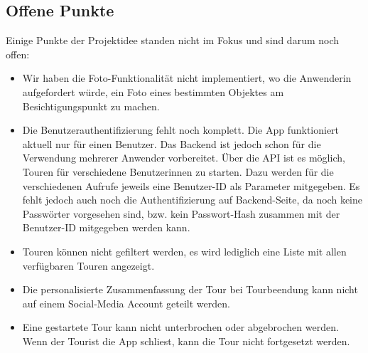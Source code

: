 \subsection{Offene Punkte}
\label{offenePunkte}
Einige Punkte der Projektidee standen nicht im Fokus und sind darum noch offen:
\begin{itemize}
\item Wir haben die Foto-Funktionalität nicht implementiert, wo die Anwenderin aufgefordert würde, ein Foto eines bestimmten Objektes am Besichtigungspunkt zu machen.
\item Die Benutzerauthentifizierung fehlt noch komplett. Die App funktioniert aktuell nur für einen Benutzer. Das Backend ist jedoch schon für die Verwendung mehrerer Anwender vorbereitet. Über die API ist es möglich, Touren für verschiedene Benutzerinnen zu starten. Dazu werden für die verschiedenen Aufrufe jeweils eine Benutzer-ID als Parameter mitgegeben. Es fehlt jedoch auch noch die Authentifizierung auf Backend-Seite, da noch keine Passwörter vorgesehen sind, bzw. kein Passwort-Hash zusammen mit der Benutzer-ID mitgegeben werden kann. 
\item Touren können nicht gefiltert werden, es wird lediglich eine Liste mit allen verfügbaren Touren angezeigt.
\item Die personalisierte Zusammenfassung der Tour bei Tourbeendung kann nicht auf einem Social-Media Account geteilt werden.
\item Eine gestartete Tour kann nicht unterbrochen oder abgebrochen werden. Wenn der Tourist die App schliest, kann die Tour nicht fortgesetzt werden.
\end{itemize}


